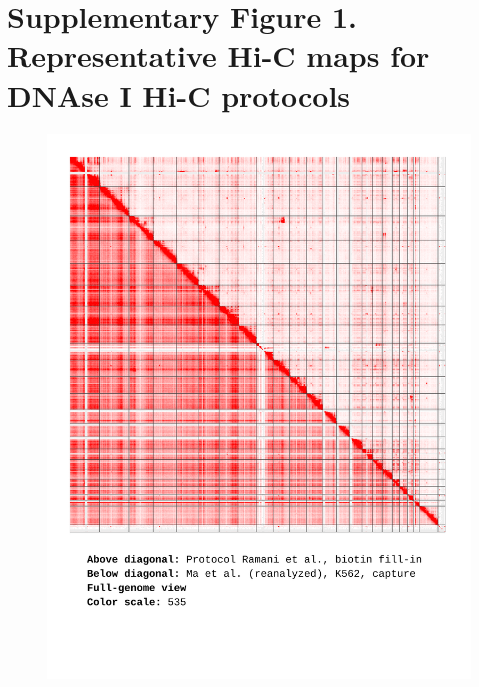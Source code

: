 \documentclass[a4paper,14pt]{extarticle}
\begin{document}
 
\section*{Supplementary Figure 1. Representative Hi-C maps for DNAse I Hi-C protocols}

\begin{figure}[hp!] \includegraphics[width=1\textwidth]{ma-pe_s30_ALL_535.pdf} \end{figure}
\end{document}
